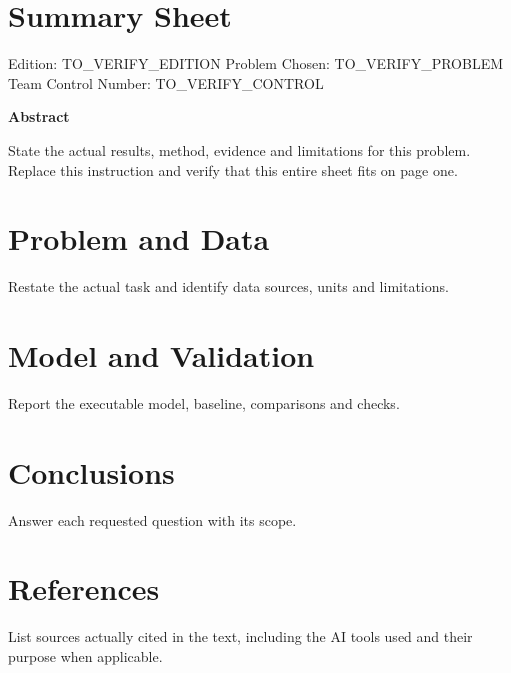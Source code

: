 \documentclass[12pt,letterpaper]{article}
\renewenvironment{abstract}{\par\noindent\textbf{Abstract}\par\normalsize}{\par}
\begin{document}
\section*{Summary Sheet}
\noindent Edition: TO\_VERIFY\_EDITION \quad Problem Chosen: TO\_VERIFY\_PROBLEM\\
\noindent Team Control Number: TO\_VERIFY\_CONTROL
\begin{abstract}
State the actual results, method, evidence and limitations for this problem. Replace this instruction and verify that this entire sheet fits on page one.
\end{abstract}
\clearpage
\section{Problem and Data}
Restate the actual task and identify data sources, units and limitations.
\section{Model and Validation}
Report the executable model, baseline, comparisons and checks.
\section{Conclusions}
Answer each requested question with its scope.
\section*{References}
List sources actually cited in the text, including the AI tools used and their purpose when applicable.
\end{document}
